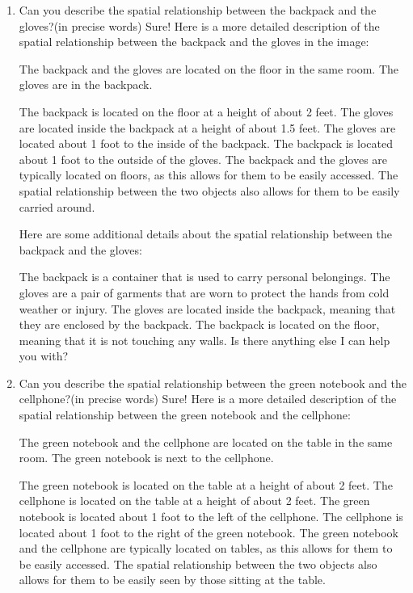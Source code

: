 \begin{enumerate}
    \item Can you describe the spatial relationship between the backpack and the gloves?(in precise words)
    \subitem Sure! Here is a more detailed description of the spatial relationship between the backpack and the gloves in the image:

    The backpack and the gloves are located on the floor in the same room. The gloves are in the backpack.
    
    The backpack is located on the floor at a height of about 2 feet.
    The gloves are located inside the backpack at a height of about 1.5 feet.
    The gloves are located about 1 foot to the inside of the backpack.
    The backpack is located about 1 foot to the outside of the gloves.
    The backpack and the gloves are typically located on floors, as this allows for them to be easily accessed. The spatial relationship between the two objects also allows for them to be easily carried around.
    
    Here are some additional details about the spatial relationship between the backpack and the gloves:
    
    The backpack is a container that is used to carry personal belongings.
    The gloves are a pair of garments that are worn to protect the hands from cold weather or injury.
    The gloves are located inside the backpack, meaning that they are enclosed by the backpack.
    The backpack is located on the floor, meaning that it is not touching any walls.
    Is there anything else I can help you with?
    \item Can you describe the spatial relationship between the green notebook and the cellphone?(in precise words)
    \subitem 
    Sure! Here is a more detailed description of the spatial relationship between the green notebook and the cellphone:
    
    The green notebook and the cellphone are located on the table in the same room. The green notebook is next to the cellphone.
    
    The green notebook is located on the table at a height of about 2 feet.
    The cellphone is located on the table at a height of about 2 feet.
    The green notebook is located about 1 foot to the left of the cellphone.
    The cellphone is located about 1 foot to the right of the green notebook.
    The green notebook and the cellphone are typically located on tables, as this allows for them to be easily accessed. The spatial relationship between the two objects also allows for them to be easily seen by those sitting at the table.
    

\end{enumerate}
